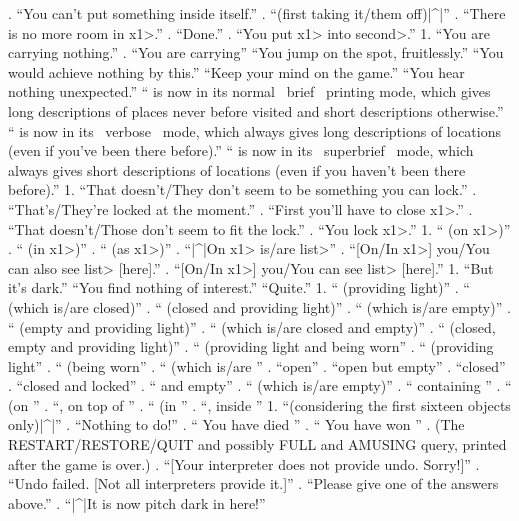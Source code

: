 . ``You can't put something inside itself.''
. ``(first taking it/them off)|^|''
. ``There is no more room in \<x1>.''
. ``Done.''
. ``You put \<x1> into \<second>.''
   1. ``You are carrying nothing.''
. ``You are carrying'' 
   ``You jump on the spot, fruitlessly.''
 ``You would achieve nothing by this.''
   ``Keep your mind on the game.''
  ``You hear nothing unexpected.''
  `` is now in its normal ~brief~ printing mode, which gives
long descriptions of places never before visited and short
descriptions otherwise.''
  `` is now in its ~verbose~ mode, which always gives long
descriptions of locations (even if you've been there before).''
  `` is now in its ~superbrief~ mode, which always gives short
descriptions of locations (even if you haven't been there before).''
   1. ``That doesn't/They don't seem to be something you can lock.''
. ``That's/They're locked at the moment.''
. ``First you'll have to close \<x1>.''
. ``That doesn't/Those don't seem to fit the lock.''
. ``You lock \<x1>.''
 1. `` (on \<x1>)''
. `` (in \<x1>)''
. `` (as \<x1>)'' 
. ``|^|On \<x1> is/are \<list>''
. ``[On/In \<x1>] you/You can also see \<list> [here].''
. ``[On/In \<x1>] you/You can see \<list> [here].''
 1. ``But it's dark.''
\N   ``You find nothing of interest.''
   ``Quite.''
 1. `` (providing light)''
. `` (which is/are closed)''
. `` (closed and providing light)''
. `` (which is/are empty)''
. `` (empty and providing light)''
. `` (which is/are closed and empty)''
. `` (closed, empty and providing light)''
. `` (providing light and being worn''
. `` (providing light''
. `` (being worn''
. `` (which is/are ''
. ``open''
. ``open but empty''
. ``closed''
. ``closed and locked''
. `` and empty''
. `` (which is/are empty)''
. `` containing ''
. `` (on ''
. ``, on top of ''
. `` (in ''
. ``, inside ''
 1. ``(considering the first sixteen objects only)|^|''
. ``Nothing to do!''
. `` You have died ''
. `` You have won ''
. (The RESTART/RESTORE/QUIT and possibly FULL
and AMUSING query, printed after the game is over.)
. ``[Your interpreter does not provide undo. Sorry!]''
. ``Undo failed. [Not all interpreters provide it.]''
. ``Please give one of the answers above.''
. ``|^|It is now pitch dark in here!''
